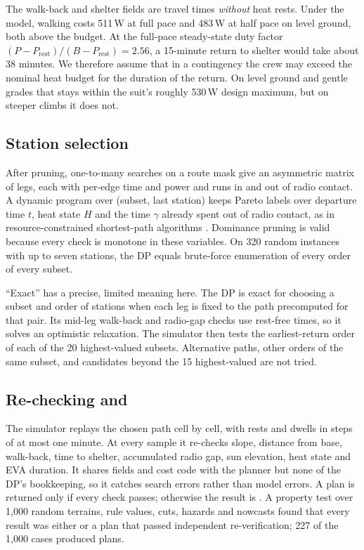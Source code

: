 The walk-back and shelter fields are travel times \emph{without} heat rests. Under the model, walking costs 511\,W at full pace and 483\,W at half pace on level ground, both above the budget. At the full-pace steady-state duty factor $(P-P_{\text{rest}})/(B-P_{\text{rest}})=2.56$, a 15-minute return to shelter would take about 38 minutes. We therefore assume that in a contingency the crew may exceed the nominal heat budget for the duration of the return. On level ground and gentle grades that stays within the suit's roughly 530\,W design maximum, but on steeper climbs it does not.

\subsection{Station selection}
\label{sec:dp}
After pruning, one-to-many searches on a route mask give an asymmetric matrix of legs, each with per-edge time and power and runs in and out of radio contact. A dynamic program over (subset, last station) \citep{bellman1962,heldkarp1962} keeps Pareto labels over departure time $t$, heat state $H$ and the time $\gamma$ already spent out of radio contact, as in resource-constrained shortest-path algorithms \citep{feillet2004,irnich2005}. Dominance pruning is valid because every check is monotone in these variables. On 320 random instances with up to seven stations, the DP equals brute-force enumeration of every order of every subset.

``Exact'' has a precise, limited meaning here. The DP is exact for choosing a subset and order of stations when each leg is fixed to the path precomputed for that pair. Its mid-leg walk-back and radio-gap checks use rest-free times, so it solves an optimistic relaxation. The simulator then tests the earliest-return order of each of the 20 highest-valued subsets. Alternative paths, other orders of the same subset, and candidates beyond the 15 highest-valued are not tried.

\subsection{Re-checking and \stayin}
\label{sec:sim}
The simulator replays the chosen path cell by cell, with rests and dwells in steps of at most one minute. At every sample it re-checks slope, distance from base, walk-back, time to shelter, accumulated radio gap, sun elevation, heat state and EVA duration. It shares fields and cost code with the planner but none of the DP's bookkeeping, so it catches search errors rather than model errors. A plan is returned only if every check passes; otherwise the result is \stayin. A property test over 1,000 random terrains, rule values, cuts, hazards and nowcasts found that every result was either \stayin or a plan that passed independent re-verification; 227 of the 1,000 cases produced plans.

